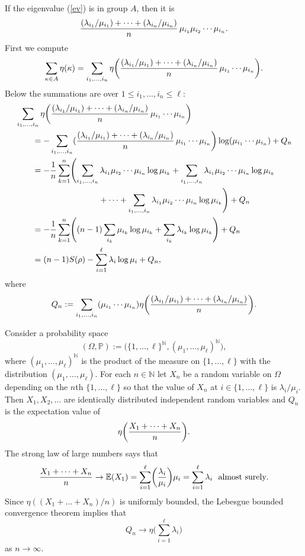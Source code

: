 \documentclass[12pt,a4paper]{article}
\def\bN{\mathbb{N}}
\def\bE{\mathbb{E}}
\begin{document}
If the eigenvalue (\ref{ev}) is in group $A$, then it is
$$
{(\lambda_{i_1}/\mu_{i_1})+\dots+(\lambda_{i_n}/\mu_{i_n})\over n}
\,\mu_{i_1}\mu_{i_2}\cdots\mu_{i_n}.
$$
First we compute
$$
\sum_{\kappa \in A}\eta(\kappa)=\sum_{i_1,\dots,i_n} \eta
\biggl({(\lambda_{i_1}/\mu_{i_1})+\dots+(\lambda_{i_n}/\mu_{i_n})\over n}
\,\mu_{i_1}\cdots\mu_{i_n}\biggr).
$$
Below the summations are over $1\le i_1,\dots,i_n \le \ell$:
\begin{align*} 
&\sum_{i_1,\dots,i_n} \eta
\biggl({(\lambda_{i_1}/\mu_{i_1})+\dots+(\lambda_{i_n}/\mu_{i_n})\over n}
\,\mu_{i_1}\cdots\mu_{i_n}\biggr) \\ & \qquad =-\sum_{i_1,\dots,i_n}
({(\lambda_{i_1}/\mu_{i_1})+\dots+(\lambda_{i_n}/\mu_{i_n})\over n}
\,\mu_{i_1}\cdots\mu_{i_n}\biggr)\log(\mu_{i_1}\cdots\mu_{i_n})+Q_n \\
&\qquad =-{1\over n}\sum_{k=1}^n\Biggl(\sum_{i_1,\dots,i_n}
\lambda_{i_1}\mu_{i_2}\cdots\mu_{i_n}\log\mu_{i_k}
+\sum_{i_1,\dots,i_n}\lambda_{i_1}\mu_{i_2}\cdots\mu_{i_n}\log\mu_{i_k} \\
&\qquad\qquad\qquad\qquad\qquad+\dots
+\sum_{i_1,\dots,i_n}\lambda_{i_1}\mu_{i_2}\cdots\mu_{i_n}\log\mu_{i_k}
\Biggr)+Q_n \\
&\qquad =-{1\over n}\sum_{k=1}^n\Biggl((n-1)\sum_{i_k}\mu_{i_k}\log\mu_{i_k}
+\sum_{i_k}\lambda_{i_k}\log\mu_{i_k}\Biggr)+Q_n \\
&\qquad =(n-1)S(\rho)-\sum_{i=1}^\ell\lambda_i\log\mu_i +Q_n,
\end{align*}
where
$$
Q_n:=\sum_{i_1,\dots,i_n}(\mu_{i_1}\cdots\mu_{i_n})
\eta\biggl({(\lambda_{i_1}/\mu_{i_1})+\dots+(\lambda_{i_n}/\mu_{i_n})\over n}
\biggr).
$$

Consider a probability space
$$
(\Omega,\mathbb{P}):=\bigl(\{1,\dots,\ell\}^\bN,(\mu_1,\dots,\mu_\ell)^\bN\bigr),
$$
where $(\mu_1,\dots,\mu_\ell)^\bN$ is the product of the measure on $\{1,
\dots,\ell\}$ with the distribution $(\mu_1,\dots,\mu_\ell)$. For each $n\in\bN$
let $X_n$ be a random variable on $\Omega$ depending on the $n$th $\{1,\dots,\ell\}$
so that the value of $X_n$ at $i\in\{1,\dots,\ell\}$ is $\lambda_i/\mu_i$. Then
$X_1,X_2,\dots$ are identically distributed independent random variables and $Q_n$
is the expectation value
of
$$
\eta \biggl({X_1+\dots+X_n\over n}\biggr).
$$
The strong law of large numbers says that
$$
{X_1+\dots+X_n\over n}\to \bE(X_1)
=\sum_{i=1}^\ell\biggl({\lambda_i\over\mu_i}\biggr)\mu_i=\sum_{i=1}^\ell \lambda_i
\ \ \mbox{almost surely}.
$$
Since $ \eta((X_1+\dots+X_n)/n)$ is uniformly bounded, the Lebesgue bounded
convergence theorem implies that
$$
Q_n\to \eta\Big(\sum_{i=1}^\ell \lambda_i\Big) $$
as $n\to\infty$.
\end{document}
